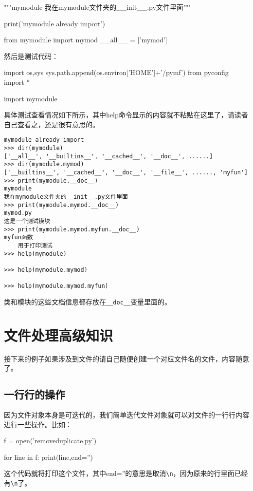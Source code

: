 \documentclass[12pt,oneside]{book}
\begin{document}
\begin{common-format}
\begin{tcbpython}
"""mymodule
我在mymodule文件夹的__init__.py文件里面"""

print('mymodule already import')

from mymodule import mymod
__all__ = ['mymod']
\end{tcbpython}

然后是测试代码：
\begin{tcbpython}
import os,sys
sys.path.append(os.environ['HOME']+'/pymf')
from pyconfig import *

import  mymodule
\end{tcbpython}


具体测试查看情况如下所示，其中help命令显示的内容就不粘贴在这里了，请读者自己查看之，还是很有意思的。
\begin{Verbatim}
mymodule already import
>>> dir(mymodule)
['__all__', '__builtins__', '__cached__', '__doc__', ......]
>>> dir(mymodule.mymod)
['__builtins__', '__cached__', '__doc__', '__file__', ......, 'myfun']
>>> print(mymodule.__doc__)
mymodule
我在mymodule文件夹的__init__.py文件里面
>>> print(mymodule.mymod.__doc__)
mymod.py
这是一个测试模块
>>> print(mymodule.mymod.myfun.__doc__)
myfun函数
    用于打印测试
>>> help(mymodule)

>>> help(mymodule.mymod)

>>> help(mymodule.mymod.myfun)

\end{Verbatim}

类和模块的这些文档信息都存放在\verb+__doc__+变量里面的。




\chapter{文件处理高级知识}
接下来的例子如果涉及到文件的请自己随便创建一个对应文件名的文件，内容随意了。

\section{一行行的操作}
因为文件对象本身是可迭代的，我们简单迭代文件对象就可以对文件的一行行内容进行一些操作。比如：
\begin{tcbpython}
f = open('removeduplicate.py')

for line in f:
    print(line,end='')
\end{tcbpython}
这个代码就将打印这个文件，其中end=''的意思是取消\verb+\n+，因为原来的行里面已经有\verb+\n+了。


\end{common-format}
\end{document}
